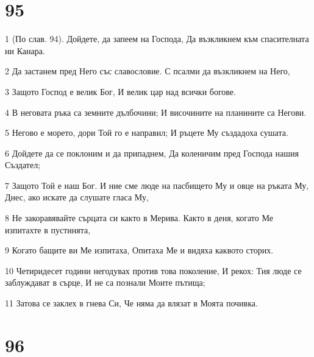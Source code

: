 \chapter{95}

\par 1 (По слав. 94). Дойдете, да запеем на Господа, Да възкликнем към спасителната ни Канара.
\par 2 Да застанем пред Него със славословие. С псалми да възкликнем на Него,
\par 3 Защото Господ е велик Бог, И велик цар над всички богове.
\par 4 В неговата ръка са земните дълбочини; И височините на планините са Негови.
\par 5 Негово е морето, дори Той го е направил; И ръцете Му създадоха сушата.
\par 6 Дойдете да се поклоним и да припаднем, Да коленичим пред Господа нашия Създател;
\par 7 Защото Той е наш Бог. И ние сме люде на пасбището Му и овце на ръката Му, Днес, ако искате да слушате гласа Му,
\par 8 Не закоравявайте сърцата си както в Мерива. Както в деня, когато Ме изпитахте в пустинята,
\par 9 Когато бащите ви Ме изпитаха, Опитаха Ме и видяха каквото сторих.
\par 10 Четиридесет години негодувах против това поколение, И рекох: Тия люде се заблуждават в сърце, И не са познали Моите пътища;
\par 11 Затова се заклех в гнева Си, Че няма да влязат в Моята почивка.

\chapter{96}

